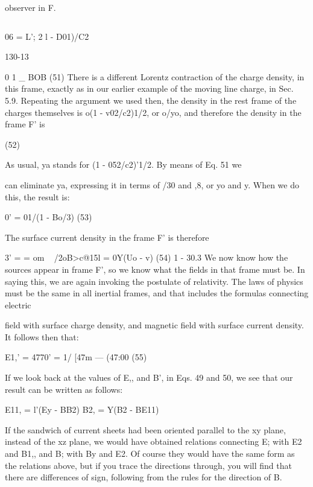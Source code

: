 observer in F.

\begin{equation}
\end{equation}

06 = L'; 2
l - D01)/C2

130-13

0 1 _ BOB (51)
There is a different Lorentz contraction of the charge density, in this
frame, exactly as in our earlier example of the moving line charge,
in Sec. 5.9. Repeating the argument we used then, the density in
the rest frame of the charges themselves is o(1 - v02/c2)1/2, or o/yo,
and therefore the density in the frame F' is

\begin{equation}
\end{equation}
(52)

As usual, ya stands for (1 - 052/c2)'1/2. By means of Eq. 51 we

can eliminate ya, expressing it in terms of /30 and ,8, or yo and y.
When we do this, the result is:

\begin{equation}
\end{equation}
0' = 01/(1 - Bo/3) (53)

The surface current density in the frame F' is therefore

\begin{equation}
\end{equation}
3' =  = om ~ /2oB>c@15l = 0Y(Uo - v) (54)
1 - 30.3
We now know how the sources appear in frame F', so we know what
the fields in that frame must be. In saying this, we are again invoking
the postulate of relativity. The laws of physics must be the same in
all inertial frames, and that includes the formulas connecting electric

field with surface charge density, and magnetic field with surface
current density. It follows then that:

\begin{equation}
\end{equation}
E1,' = 4770' = 1/ [47m --- (47:00  (55)
 

If we look back at the values of E,, and B', in Eqs. 49 and 50, we see
that our result can be written as follows:

\begin{equation}
\end{equation}
E11, = l'(Ey - BB2)
B2, = Y(B2 - BE11)

If the sandwich of current sheets had been oriented parallel to the
xy plane, instead of the xz plane, we would have obtained relations
connecting E; with E2 and B1,, and B; with By and E2. Of course they
would have the same form as the relations above, but if you trace
the directions through, you will find that there are differences of sign,
following from the rules for the direction of B.

